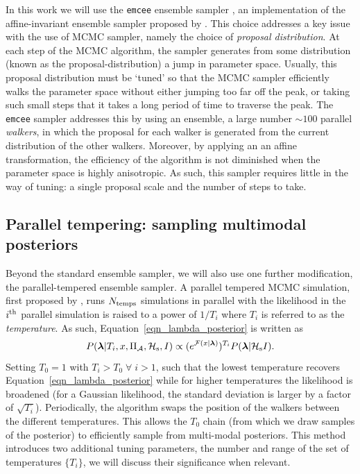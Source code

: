 \documentclass[aps, prd, twocolumn, superscriptaddress, floatfix, showpacs, nofootinbib, longbibliography]{revtex4-1}
\begin{document}
In this work we will use the \texttt{emcee} ensemble sampler
\citep{foreman-mackay2013}, an implementation of the affine-invariant ensemble
sampler proposed by \citet{goodman2010}. This choice addresses a key issue with
the use of MCMC sampler, namely the choice of \emph{proposal distribution}. At
each step of the MCMC algorithm, the sampler generates from some distribution
(known as the proposal-distribution) a jump in parameter space. Usually, this
proposal distribution must be `tuned' so that the MCMC sampler efficiently
walks the parameter space without either jumping too far off the peak, or
taking such small steps that it takes a long period of time to traverse the
peak. The \texttt{emcee} sampler addresses this by using an ensemble, a large
number ${\sim}100$ parallel \emph{walkers}, in which the proposal for each
walker is generated from the current distribution of the other walkers.
Moreover, by applying an an affine transformation, the efficiency of the
algorithm is not diminished when the parameter space is highly anisotropic. As
such, this sampler requires little in the way of tuning: a single proposal
scale and the number of steps to take.

\subsection{Parallel tempering: sampling multimodal posteriors}
\label{sec_parallel_tempering}
Beyond the standard ensemble sampler, we will also use one further
modification, the parallel-tempered ensemble sampler. A parallel
tempered MCMC simulation, first proposed by \citet{swendsen1986}, runs
$N_{\rm temps}$ simulations in parallel with the likelihood in the $i^{\rm th}$
parallel simulation is raised to a power of $1/T_{i}$ where $T_i$ is referred
to as the \emph{temperature}. As such, Equation~\eqref{eqn_lambda_posterior} is
written as
\begin{equation}
P(\boldsymbol{\mathbf{\lambda}} | T_i, x, \Pi_\mathcal{A}, \mathcal{H}_{\rm s}, I)
\propto (e^{{\mathcal{F}}(x| \boldsymbol{\mathbf{\lambda}})})^{T_i} P(\boldsymbol{\mathbf{\lambda}}| \mathcal{H}_{\rm s} I).
\end{equation}
Setting $T_0=1$ with $T_i > T_0 \; \forall \; i > 1$, such that the lowest
temperature recovers Equation~\eqref{eqn_lambda_posterior} while for higher
temperatures the likelihood is broadened (for a Gaussian likelihood, the
standard deviation is larger by a factor of $\sqrt{T_i}$). Periodically, the
algorithm swaps the position of the walkers between the different
temperatures. This allows the $T_0$ chain (from which we draw samples of the
posterior) to efficiently sample from multi-modal posteriors. This method introduces
two additional tuning parameters, the number and range of the set of
temperatures $\{T_i\}$, we will discuss their significance when relevant.
\end{document}
